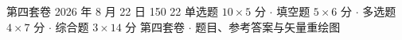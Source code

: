 \documentclass[11pt,a4paper,fontset=none]{ctexart}
\begin{document}
\raggedbottom

\makecover
  {第四套卷}
  {2026 年 8 月 22 日}
  {150}
  {22}
  {单选题 \(10\times5\) 分 \(\cdot\)
   填空题 \(5\times6\) 分 \(\cdot\)
   多选题 \(4\times7\) 分 \(\cdot\)
   综合题 \(3\times14\) 分}
  {第四套卷 \(\cdot\) 题目、参考答案与矢量重绘图}



\solutiondivider

\end{document}
